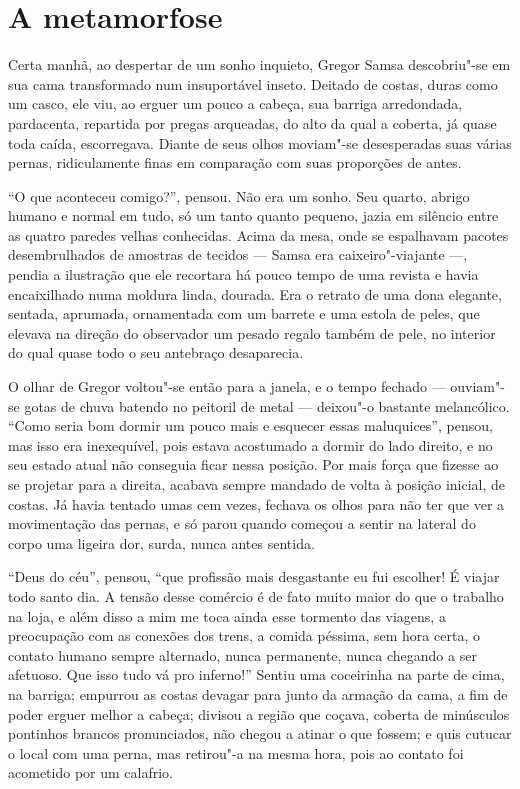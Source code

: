 \movetooddpage
{}
\part*{A metamorfose}

\sectionitem

Certa manhã, ao despertar de um sonho inquieto, Gregor Samsa descobriu"-se
em sua cama transformado num insuportável inseto. Deitado de costas, duras
como um casco, ele viu, ao erguer um pouco a cabeça, sua barriga arredondada,
pardacenta, repartida por pregas arqueadas, do alto da qual a coberta, já
quase toda caída, escorregava. Diante de seus olhos moviam"-se
desesperadas suas várias pernas, ridiculamente finas em comparação com
suas proporções de antes.

“O que aconteceu comigo?”, pensou. Não era um sonho. Seu quarto, abrigo
humano e normal em tudo, só um tanto quanto pequeno, jazia em silêncio
entre as quatro paredes velhas conhecidas. Acima da mesa, onde se
espalhavam pacotes desembrulhados de amostras de tecidos --- Samsa era
caixeiro"-viajante ---, pendia a ilustração que ele recortara há pouco tempo
de uma revista e havia encaixilhado numa moldura linda, dourada. Era o
retrato de uma dona elegante, sentada, aprumada, ornamentada com um
barrete e uma estola de peles, que elevava na direção do observador um
pesado regalo também de pele, no interior do qual quase todo o seu
antebraço desaparecia.

O olhar de Gregor voltou"-se então para a janela, e o tempo fechado ---
ouviam"-se gotas de chuva batendo no peitoril de metal --- deixou"-o bastante
melancólico. “Como seria bom dormir um pouco mais e esquecer
essas maluquices”, pensou, mas isso era inexequível, pois estava
acostumado a dormir do lado direito, e no seu estado atual não conseguia
ficar nessa posição. Por mais força que fizesse ao se projetar para a
direita, acabava sempre mandado de volta à posição inicial, de costas. Já
havia tentado umas cem vezes, fechava os olhos para não ter que ver a
movimentação das pernas, e só parou quando começou a sentir na
lateral do corpo uma
ligeira dor, surda, nunca antes sentida.

“Deus do céu”, pensou, “que profissão mais desgastante eu fui escolher! É
viajar todo santo dia. A tensão desse comércio é de fato muito maior do
que o trabalho na loja, e além disso a mim me toca ainda esse tormento das
viagens, a preocupação com as conexões dos trens, a comida péssima, sem
hora certa, o contato humano sempre alternado, nunca permanente, nunca
chegando a ser afetuoso. Que isso tudo vá pro inferno!” Sentiu uma
coceirinha na parte de cima, na barriga; empurrou as costas devagar para
junto da armação da cama, a fim de poder erguer melhor a cabeça; divisou a
região que coçava, coberta de minúsculos pontinhos brancos pronunciados,
não chegou a atinar o que fossem; e quis cutucar o local com uma perna,
mas retirou"-a na mesma hora, pois ao contato foi acometido por um
calafrio.

